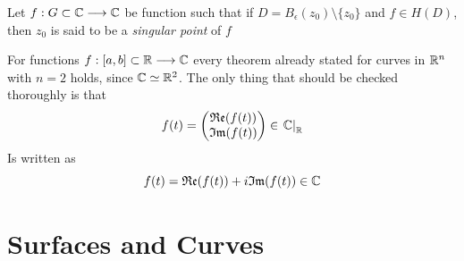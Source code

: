\documentclass[../complete.tex]{subfiles}
\begin{document}
\begin{dfn}
	Let $f:G\subset\Cf\fto\Cf$ be function such that if $D=B_\epsilon(z_0)\setminus\{z_0\}$ and $f\in H(D)$, then $z_0$ is said to be a \textit{singular point} of $f$
\end{dfn}
%
For functions $f:[a,b]\subset\R\fto\Cf$ every theorem already stated for curves in $\R^n$ with $n=2$ holds, since $\Cf\simeq\R^2$. The only thing that should be checked thoroughly is that
\begin{equation*}
	f(t)=\begin{pmatrix}\real(f(t))\\\imaginary(f(t))\end{pmatrix}\in\derin[\R]{\Cf}
\end{equation*}
Is written as
\begin{equation*}
	f(t)=\real(f(t))+i\imaginary(f(t))\in\Cf
\end{equation*}
\section{Surfaces and Curves}
\end{document}
